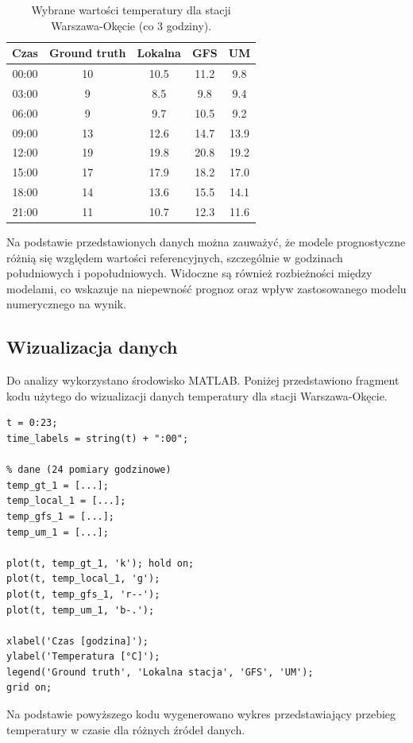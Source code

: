 \documentclass[a4paper,12pt]{article}
\begin{document}
\begin{table}[h]
\centering
\begin{tabular}{@{}ccccc@{}}
\toprule
Czas & Ground truth & Lokalna & GFS & UM \\ \midrule
00:00 & 10 & 10.5 & 11.2 & 9.8 \\
03:00 & 9  & 8.5  & 9.8  & 9.4 \\
06:00 & 9  & 9.7  & 10.5 & 9.2 \\
09:00 & 13 & 12.6 & 14.7 & 13.9 \\
12:00 & 19 & 19.8 & 20.8 & 19.2 \\
15:00 & 17 & 17.9 & 18.2 & 17.0 \\
18:00 & 14 & 13.6 & 15.5 & 14.1 \\
21:00 & 11 & 10.7 & 12.3 & 11.6 \\ \bottomrule
\end{tabular}
\caption{Wybrane wartości temperatury dla stacji Warszawa-Okęcie (co 3 godziny).}
\end{table}
\noindent
Na podstawie przedstawionych danych można zauważyć, że modele prognostyczne różnią się względem wartości referencyjnych, szczególnie w godzinach południowych i popołudniowych. Widoczne są również rozbieżności między modelami, co wskazuje na niepewność prognoz oraz wpływ zastosowanego modelu numerycznego na wynik.
\newpage
\subsection{Wizualizacja danych}

Do analizy wykorzystano środowisko MATLAB. Poniżej przedstawiono fragment kodu użytego do wizualizacji danych temperatury dla stacji Warszawa-Okęcie.

\begin{verbatim}
t = 0:23;
time_labels = string(t) + ":00";

% dane (24 pomiary godzinowe)
temp_gt_1 = [...];
temp_local_1 = [...];
temp_gfs_1 = [...];
temp_um_1 = [...];

plot(t, temp_gt_1, 'k'); hold on;
plot(t, temp_local_1, 'g');
plot(t, temp_gfs_1, 'r--');
plot(t, temp_um_1, 'b-.');

xlabel('Czas [godzina]');
ylabel('Temperatura [°C]');
legend('Ground truth', 'Lokalna stacja', 'GFS', 'UM');
grid on;
\end{verbatim}
\noindent
Na podstawie powyższego kodu wygenerowano wykres przedstawiający przebieg temperatury w czasie dla różnych źródeł danych.
\end{document}
